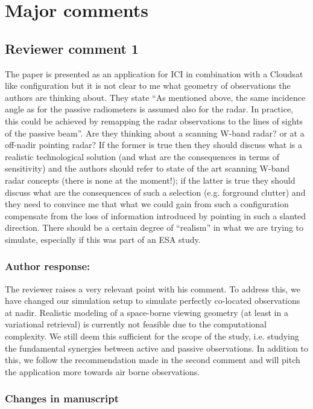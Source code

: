\section{Major comments}

\subsection*{Reviewer comment 1}

The paper is presented as an application for ICI in combination with a
Cloudsat like configuration but it is not clear to me what geometry of
observations the authors are thinking about. They state “As mentioned above, the
same incidence angle as for the passive radiometers is assumed also for the
radar. In practice, this could be achieved by remapping the radar observations to
the lines of sights of the passive beam”. Are they thinking about a scanning
W-band radar? or at a off-nadir pointing radar? If the former is true then they
should discuss what is a realistic technological solution (and what are the
consequences in terms of sensitivity) and the authors should refer to state of
the art scanning W-band radar concepts (there is none at the moment!); if the
latter is true they should discuss what are the consequences of such a selection
(e.g. forground clutter) and they need to convince me that what we could gain
from such a configuration compensate from the loss of information introduced by
pointing in such a slanted direction. There should be a certain degree of
“realism” in what we are trying to simulate, especially if this was part of an
ESA study.

\subsubsection*{Author response:}

The reviewer raises a very relevant point with his comment. To address this, we
have changed our simulation setup to simulate perfectly co-located observations
at nadir. Realistic modeling of a space-borne viewing geometry (at least in a
variational retrieval) is currently not feasible due to the computational
complexity. We still deem this sufficient for the scope of the study, i.e.
studying the fundamental synergies between active and passive observations. In
addition to this, we follow the recommendation made in the second comment and
will pitch the application more towards air borne observations.

\subsubsection*{Changes in manuscript}

